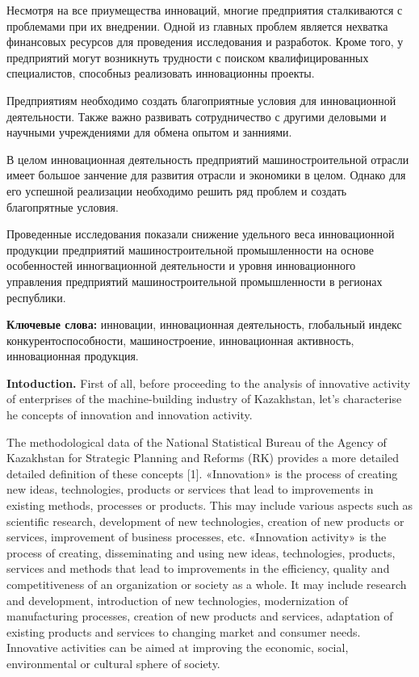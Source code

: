 Несмотря на все приумещества инноваций, многие предприятия сталкиваются
с проблемами при их внедрении. Одной из главных проблем является
нехватка финансовых ресурсов для проведения исследования и разработок.
Кроме того, у предприятий могут возникнуть трудности с поиском
квалифицированных специалистов, способныз реализовать инновационны
проекты.

Предприятиям необходимо создать благоприятные условия для инновационной
деятельности. Также важно развивать сотрудничество с другими деловыми и
научными учреждениями для обмена опытом и занниями.

В целом инновационная деятельность предприятий машиностроительной
отрасли имеет большое занчение для развития отрасли и экономики в целом.
Однако для его успешной реализации необходимо решить ряд проблем и
создать благопрятные условия.

Проведенные исследования показали снижение удельного веса инновационной
продукции предприятий машиностроительной промышленности на основе
особенностей инногвационной деятельности и уровня инновационного
управления предприятий машиностроительной промышленности в регионах
республики.

{\bfseries Ключевые слова:} инновации, инновационная деятельность,
глобальный индекс конкурентоспособности, машиностроение, инновационная
активность, инновационная продукция.

{\bfseries Intoduction.} First of all, before proceeding to the analysis of
innovative activity of enterprises of the machine-building industry of
Kazakhstan, let's characterise he concepts of innovation and innovation
activity.

The methodological data of the National Statistical Bureau of the Agency
of Kazakhstan for Strategic Planning and Reforms (RK) provides a more
detailed detailed definition of these concepts {[}1{]}. «Innovation» is
the process of creating new ideas, technologies, products or services
that lead to improvements in existing methods, processes or products.
This may include various aspects such as scientific research,
development of new technologies, creation of new products or services,
improvement of business processes, etc. «Innovation activity» is the
process of creating, disseminating and using new ideas, technologies,
products, services and methods that lead to improvements in the
efficiency, quality and competitiveness of an organization or society as
a whole. It may include research and development, introduction of new
technologies, modernization of manufacturing processes, creation of new
products and services, adaptation of existing products and services to
changing market and consumer needs. Innovative activities can be aimed
at improving the economic, social, environmental or cultural sphere of
society.


